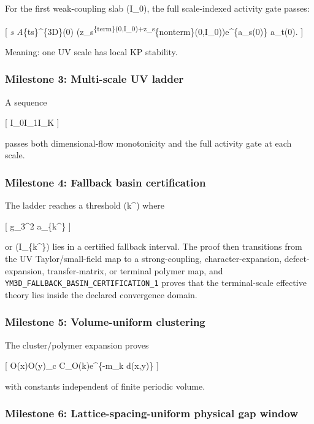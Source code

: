 \documentclass[
]{article}
\begin{document}
For the first weak-coupling slab (I\_0), the full scale-indexed activity
gate passes:

{[} \sum\emph{s A}\{ts\}\^{}\{3D\}(0)
\left(z\_s\textsuperscript{\{\rm term\}(0,I\_0)+z\_s}\{\rm nonterm\}(0,I\_0)\right)e\^{}\{a\_s(0)\}
\le a\_t(0). {]}

Meaning: one UV scale has local KP stability.

\subsubsection{Milestone 3: Multi-scale UV
ladder}\label{milestone-3-multi-scale-uv-ladder}

A sequence

{[} I\_0\to I\_1\to\cdots\to I\_K {]}

passes both dimensional-flow monotonicity and the full activity gate at
each scale.

\subsubsection{Milestone 4: Fallback basin
certification}\label{milestone-4-fallback-basin-certification}

The ladder reaches a threshold (k\^{}\ast) where

{[} g\_3\^{}2 a\_\{k\^{}\ast\} {]}

or (I\_\{k\^{}\ast\}) lies in a certified fallback interval. The proof
then transitions from the UV Taylor/small-field map to a
strong-coupling, character-expansion, defect-expansion, transfer-matrix,
or terminal polymer map, and
\texttt{YM3D\_FALLBACK\_BASIN\_CERTIFICATION\_1} proves that the
terminal-scale effective theory lies inside the declared convergence
domain.

\subsubsection{Milestone 5: Volume-uniform
clustering}\label{milestone-5-volume-uniform-clustering}

The cluster/polymer expansion proves

{[} \textbar{}\langle O(x)O(y)\rangle\_c\textbar{}
\le C\_O(k)e\^{}\{-m\_k d(x,y)\} {]}

with constants independent of finite periodic volume.

\subsubsection{Milestone 6: Lattice-spacing-uniform physical gap
window}\label{milestone-6-lattice-spacing-uniform-physical-gap-window}
\end{document}
